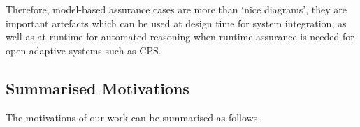 %
Therefore, model-based assurance cases are more than `nice diagrams', they are important artefacts which can be used at design time for system integration, as well as at runtime for automated reasoning when runtime assurance is needed for open adaptive systems such as CPS. 

\subsection{Summarised Motivations}
The motivations of our work can be summarised as follows. 
\begin{itemize}
	
	
	

\end{itemize}
